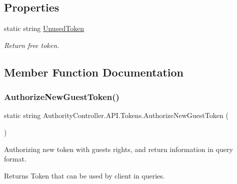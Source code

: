 \subsection*{Properties}
\begin{DoxyCompactItemize}
\item 
static string \mbox{\hyperlink{class_authority_controller_1_1_a_p_i_1_1_tokens_a43a1d7e3b2fa6ed94a20dc7b1e36b27a}{Unused\+Token}}
\begin{DoxyCompactList}\small\item\em Return free token. \end{DoxyCompactList}\end{DoxyCompactItemize}


\subsection{Member Function Documentation}
\mbox{\label{class_authority_controller_1_1_a_p_i_1_1_tokens_a0ba1c2d69ffbc73d78b7b16735f7fb5a}} 
\subsubsection{\texorpdfstring{Authorize\+New\+Guest\+Token()}{AuthorizeNewGuestToken()}}
{\footnotesize\ttfamily static string Authority\+Controller.\+A\+P\+I.\+Tokens.\+Authorize\+New\+Guest\+Token (\begin{DoxyParamCaption}{ }\end{DoxyParamCaption})\hspace{0.3cm}{\ttfamily [static]}}



Authorizing new token with guest\textquotesingle{}s rights, and return information in query format. 

\begin{DoxyReturn}{Returns}
Token that can be used by client in queries.
\end{DoxyReturn}
\mbox{\label{class_authority_controller_1_1_a_p_i_1_1_tokens_acbc5a5df26ae29633d4424873676ece3}} 
